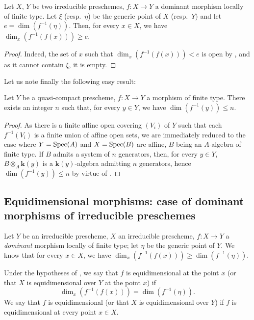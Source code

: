 \begin{corollary}[13.1.6]
\label{IV.13.1.6}
Let $X$, $Y$ be two irreducible preschemes, $f:X\to Y$ a dominant morphism locally of finite type.
Let $\xi$ \textup{(resp.\ $\eta$)} be the generic point of $X$ \textup{(resp.\ $Y$)} and let $e=\dim(f^{-1}(\eta))$.
Then, for every $x\in X$, we have $\dim_x(f^{-1}(f(x)))\geq e$.
\end{corollary}

\begin{proof}
Indeed, the set of $x$ such that $\dim_x(f^{-1}(f(x)))<e$ is open by , and as it cannot contain $\xi$, it is empty.
\end{proof}

Let us note finally the following easy result:

\begin{proposition}[13.1.7]
\label{IV.13.1.7}
Let $Y$ be a quasi-compact prescheme, $f:X\to Y$ a morphism of finite type.
There exists an integer $n$ such that, for every $y\in Y$, we have $\dim(f^{-1}(y))\leq n$.
\end{proposition}

\begin{proof}
As there is a finite affine open covering $(V_i)$ of $Y$ such that each $f^{-1}(V_i)$ is a finite union of affine open sets, we are immediately reduced to the case where $Y=\operatorname{Spec}(A)$ and $X=\operatorname{Spec}(B)$ are affine, $B$ being an $A$-algebra of finite type.
If $B$ admits a system of $n$ generators, then, for every $y\in Y$, $B\otimes_A\boldsymbol{k}(y)$ is a $\boldsymbol{k}(y)$-algebra admitting $n$ generators, hence $\dim(f^{-1}(y))\leq n$ by virtue of .
\end{proof}

\subsection{Equidimensional morphisms: case of dominant morphisms of irreducible preschemes}
\label{subsection:IV.13.2}

\begin{env}[13.2.1]
\label{IV.13.2.1}
Let $Y$ be an irreducible prescheme, $X$ an irreducible prescheme, $f:X\to Y$ a \emph{dominant} morphism locally of finite type; let $\eta$ be the generic point of $Y$.
We know  that for every $x\in X$, we have $\dim_x(f^{-1}(f(x)))\geq\dim(f^{-1}(\eta))$.
\end{env}

\begin{definition}[13.2.2]
\label{IV.13.2.2}
Under the hypotheses of , we say that $f$ is \textup{equidimensional at the point} $x$ (or that $X$ is \textup{equidimensional over $Y$ at the point} $x$) if
\[
  \dim_x(f^{-1}(f(x)))=\dim(f^{-1}(\eta)).
\]
We say that $f$ is \textup{equidimensional} (or that $X$ is \textup{equidimensional over $Y$}) if $f$ is equidimensional at every point $x\in X$.
\end{definition}

